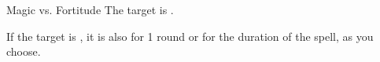 \begin{spellheader}
\end{spellheader}
\begin{spellcontent}
    \begin{spelltargetinginfo}
    \end{spelltargetinginfo}
    \begin{spelleffects}
        \begin{spellattack}{Magic vs. Fortitude}
            \spellsuccess The target is \sickened.

            If the target is \bloodied, it is also \blinded for 1 round or \deafened for the duration of the spell, as you choose.
        \end{spellattack}
        \spelldur{\durshort \dismissable}
    \end{spelleffects}
\end{spellcontent}
\begin{spellfooter}

\end{spellfooter}

